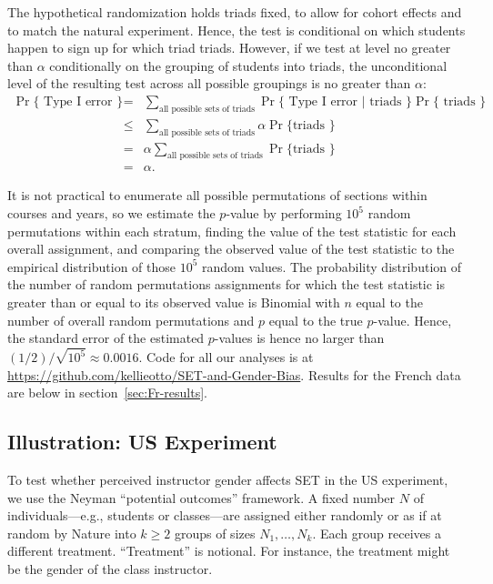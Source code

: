 \documentclass[12pt]{article}
\begin{document}
The hypothetical randomization holds triads fixed, to allow for cohort effects
and to match the natural experiment.
Hence, the test is conditional on which students happen to sign up for which triad triads.
However, if we test at level no greater than $\alpha$ conditionally 
on the grouping of students into triads, 
the unconditional level of the resulting test across all possible groupings is no 
greater than $\alpha$:
\begin{eqnarray}
   \Pr \{ \mbox{ Type I error } \} &=& \sum_{\mbox{all possible sets of triads}} 
   \Pr \{ \mbox{ Type I error } | \mbox{ triads } \} \Pr\{\mbox{ triads } \} \nonumber \\
   &\le& 
    \sum_{\mbox{all possible sets of triads}} \alpha \Pr\{\mbox{triads } \} \nonumber \\
    &=& \alpha \sum_{\mbox{all possible sets of triads}} \Pr\{\mbox{triads } \} \nonumber \\
    &=& \alpha.
\end{eqnarray}

It is not practical to enumerate all possible permutations of sections within courses
and years, so we estimate the $p$-value by performing $10^5$ 
random permutations within each stratum, finding the value of the test statistic for each
overall assignment, and comparing the observed value of the test statistic to the 
empirical distribution of those $10^5$ random values.
The probability distribution of the number of random permutations assignments for 
which the test statistic is greater than or equal to its observed value is Binomial with 
$n$ equal to the number of overall
random permutations and $p$ equal to the true $p$-value.
Hence, the standard error of the estimated $p$-values is hence no larger than 
$(1/2)/ \sqrt{10^5}
\approx 0.0016$.
Code for all our analyses is at 
\url{https://github.com/kellieotto/SET-and-Gender-Bias}.
Results for the French data are below in section~\ref{sec:Fr-results}.

\subsection{Illustration: US Experiment}
To test whether perceived instructor gender affects SET in the US experiment,
we use the Neyman ``potential outcomes'' framework.
A fixed number $N$ of individuals---e.g., students or classes---are assigned either
randomly or as if at random by Nature into 
$k \ge 2$ groups of sizes $N_1, \ldots, N_k$.
Each group receives a different treatment.
``Treatment'' is notional. 
For instance, the treatment might be the gender of the
class instructor.
\end{document}
